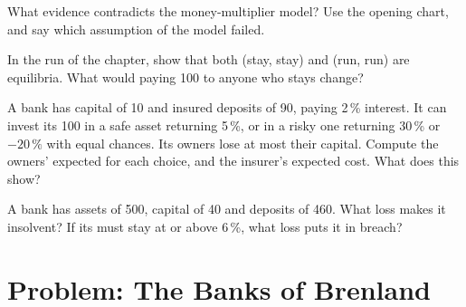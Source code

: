 \begin{exercise}[$\star\star\star$]\label{exo:g11:money-and-banking:12}
What evidence contradicts the money-multiplier model? Use the opening chart, and say which assumption of the model failed.
\end{exercise}

\begin{exercise}[$\star\star\star$]\label{exo:g11:money-and-banking:13}
In the run  of the chapter, show that both (stay, stay) and (run, run) are equilibria. What would  paying 100 to anyone who stays change?
\end{exercise}

\begin{exercise}[$\star\star\star$]\label{exo:g11:money-and-banking:14}
A bank has capital of 10 and insured deposits of 90, paying 2\,\% interest. It can invest its 100 in a safe asset returning 5\,\%, or in a risky one returning 30\,\% or $-20\,\%$
with equal chances. Its owners lose at most their capital. Compute the owners' expected  for each choice, and the insurer's expected cost. What does this show?
\end{exercise}

\begin{exercise}[$\star\star\star$]\label{exo:g11:money-and-banking:15}
A bank has assets of 500, capital of 40 and deposits of 460. What loss makes it insolvent? If its  must stay at or above 6\,\%, what loss puts it in breach?
\end{exercise}

\section{Problem: The Banks of Brenland}


